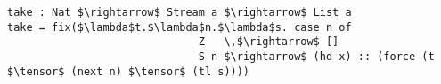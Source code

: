\begin{lstlisting}[mathescape]
take : Nat $\rightarrow$ Stream a $\rightarrow$ List a
take = fix($\lambda$t.$\lambda$n.$\lambda$s. case n of
                              Z   \,$\rightarrow$ []
                              S n $\rightarrow$ (hd x) :: (force (t $\tensor$ (next n) $\tensor$ (tl s))))
\end{lstlisting}
